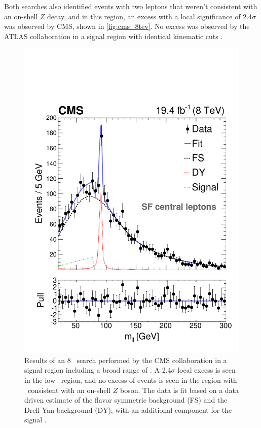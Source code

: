 Both searches also identified events with two leptons that weren't consistent with an on-shell $Z$ decay, and in this region, an excess with a local significance of 2.4$\sigma$ was observed by \ac{CMS}, shown in \autoref{fig:cms_8tev}. No excess was observed by the ATLAS collaboration in a signal region with identical kinematic cuts \cite{SUSY-2014-10}. 

\begin{centering}
\begin{figure}[!hbt]
\myfloatalign
\includegraphics[width=.9\linewidth]{figures/theory/H1_FIT_SF_CE.pdf}
\caption{ Results of an 8 \tev~search performed by the \ac{CMS} collaboration in a signal region including a broad range of \mll. A 2.4$\sigma$ local excess is seen in the low \mll~region, and no excess of events is seen in the region with \mll~consistent with an on-shell $Z$ boson. The data is fit based on a data driven estimate of the flavor symmetric background (FS) and the Drell-Yan background (DY), with an additional component for the signal \cite{CMS2}.}
\label{fig:cms_8tev}
\end{figure}
\end{centering}

